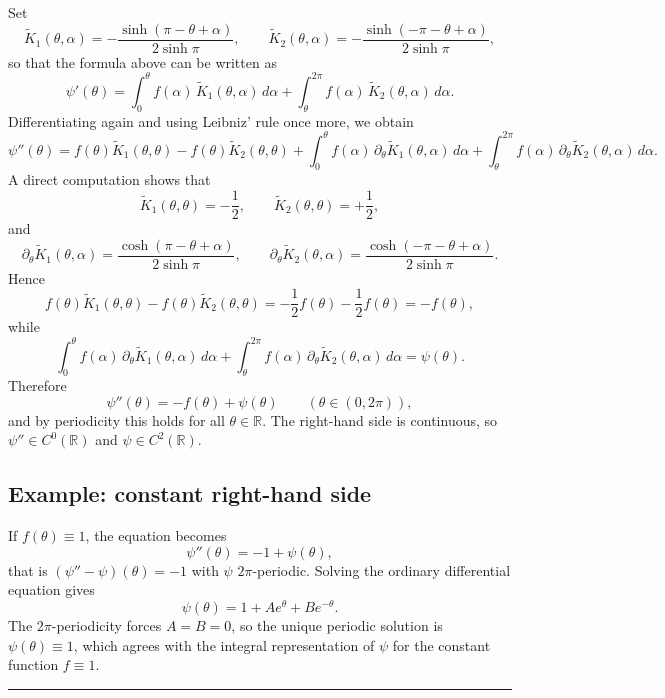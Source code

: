\documentclass[12pt,a4paper]{article}
\theoremstyle{plain}
\theoremstyle{definition}
\theoremstyle{remark}
\theoremstyle{remark}
\begin{document}
Set
\[
\widetilde K_1(\theta,\alpha)
= -\frac{\sinh(\pi-\theta+\alpha)}{2\sinh\pi},\qquad
\widetilde K_2(\theta,\alpha)
= -\frac{\sinh(-\pi-\theta+\alpha)}{2\sinh\pi},
\]
so that the formula above can be written as
\[
\psi'(\theta)
= \int_0^\theta f(\alpha)\,\widetilde K_1(\theta,\alpha)\,d\alpha
+\int_\theta^{2\pi} f(\alpha)\,\widetilde K_2(\theta,\alpha)\,d\alpha.
\]
Differentiating again and using Leibniz' rule once more, we obtain
\[
\psi''(\theta)
= f(\theta)\widetilde K_1(\theta,\theta)
-f(\theta)\widetilde K_2(\theta,\theta)
+\int_0^\theta f(\alpha)\,\partial_\theta\widetilde K_1(\theta,\alpha)\,d\alpha
+\int_\theta^{2\pi} f(\alpha)\,\partial_\theta\widetilde K_2(\theta,\alpha)\,d\alpha.
\]
A direct computation shows that
\[
\widetilde K_1(\theta,\theta)=-\frac{1}{2},\qquad
\widetilde K_2(\theta,\theta)=+\frac{1}{2},
\]
and
\[
\partial_\theta\widetilde K_1(\theta,\alpha)
= \frac{\cosh(\pi-\theta+\alpha)}{2\sinh\pi},\qquad
\partial_\theta\widetilde K_2(\theta,\alpha)
= \frac{\cosh(-\pi-\theta+\alpha)}{2\sinh\pi}.
\]
Hence
\[
f(\theta)\widetilde K_1(\theta,\theta)
- f(\theta)\widetilde K_2(\theta,\theta)
= -\frac12 f(\theta)-\frac12 f(\theta)
= -f(\theta),
\]
while
\[
\int_0^\theta f(\alpha)\,\partial_\theta\widetilde K_1(\theta,\alpha)\,d\alpha
+\int_\theta^{2\pi} f(\alpha)\,\partial_\theta\widetilde K_2(\theta,\alpha)\,d\alpha
= \psi(\theta).
\]
Therefore
\[
\psi''(\theta) = -f(\theta)+\psi(\theta)
\qquad (\theta\in(0,2\pi)),
\]
and by periodicity this holds for all $\theta\in\mathbb{R}$. The
right-hand side is continuous, so $\psi''\in C^0(\mathbb{R})$ and
$\psi\in C^2(\mathbb{R})$.

\subsection*{Example: constant right-hand side}

If $f(\theta)\equiv 1$, the equation becomes
\[
\psi''(\theta) = -1 + \psi(\theta),
\]
that is $(\psi''-\psi)(\theta)=-1$ with $\psi$ $2\pi$-periodic. Solving
the ordinary differential equation gives
\[
\psi(\theta) = 1 + A e^\theta + B e^{-\theta}.
\]
The $2\pi$-periodicity forces $A=B=0$, so the unique periodic solution is
$\psi(\theta)\equiv 1$, which agrees with the integral representation of
$\psi$ for the constant function $f\equiv1$.

\bigskip
\noindent\rule{\textwidth}{0.4pt}
\medskip
\end{document}
